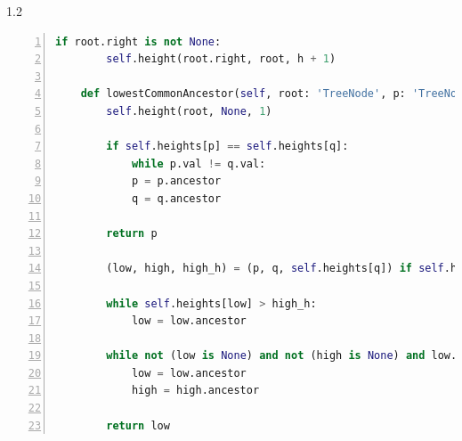 \documentclass[a4paper,twoside]{article}
\begin{document}
\begin{spacing}{1.2}
\begin{lstlisting}[language=Python,numbers=left,style=PythonStyle,caption=求LCA,label={code:lc236}]
	if root.right is not None:
		self.height(root.right, root, h + 1)

	def lowestCommonAncestor(self, root: 'TreeNode', p: 'TreeNode', q: 'TreeNode') -> 'TreeNode':
		self.height(root, None, 1)
		
		if self.heights[p] == self.heights[q]:
			while p.val != q.val:
			p = p.ancestor
			q = q.ancestor
		
		return p
		
		(low, high, high_h) = (p, q, self.heights[q]) if self.heights[p] > self.heights[q] else (q, p, self.heights[p])
		
		while self.heights[low] > high_h:
			low = low.ancestor
		
		while not (low is None) and not (high is None) and low.val != high.val:
			low = low.ancestor
			high = high.ancestor
		
		return low
\end{lstlisting}


\end{spacing}
\end{document}
